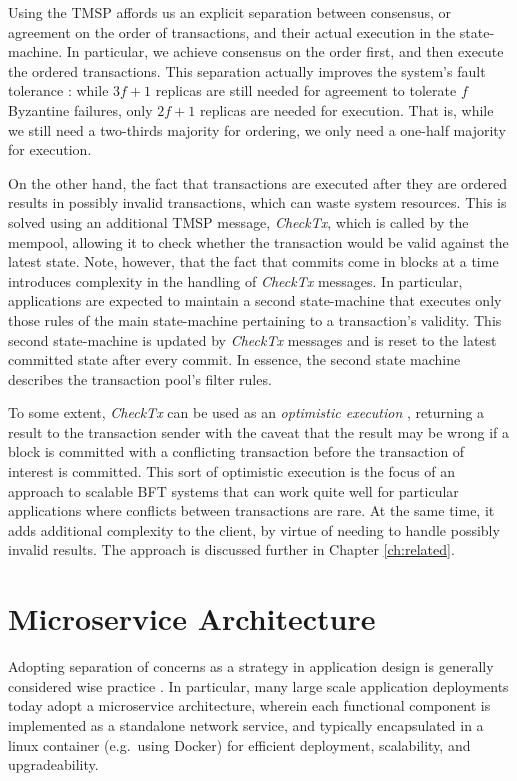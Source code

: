 Using the TMSP affords us an explicit separation between consensus, or agreement on the order of transactions, 
and their actual execution in the state-machine.
In particular, we achieve consensus on the order first, and then execute the ordered transactions.
This separation actually improves the system's fault tolerance \cite{yin2003separating}:
while $3f+1$ replicas are still needed for agreement to tolerate $f$ Byzantine failures, 
only $2f+1$ replicas are needed for execution.
That is, while we still need a two-thirds majority for ordering, we only need a one-half majority for execution.

On the other hand, the fact that transactions are executed after they are ordered results in possibly invalid transactions,
which can waste system resources. 
This is solved using an additional TMSP message, \emph{CheckTx}, which is called by the mempool,
allowing it to check whether the transaction would be valid against the latest state.
Note, however, that the fact that commits come in blocks at a time introduces complexity in the handling of \emph{CheckTx} messages.
In particular, applications are expected to maintain a second state-machine that executes only those rules of the main state-machine pertaining to a transaction's validity. 
This second state-machine is updated by \emph{CheckTx} messages and is reset to the latest committed state after every commit.
In essence, the second state machine describes the transaction pool's filter rules.

To some extent, \emph{CheckTx} can be used as an \emph{optimistic execution} \cite{optimistic_execution},
returning a result to the transaction sender with the caveat that 
the result may be wrong if a block is committed with a conflicting transaction
before the transaction of interest is committed.
This sort of optimistic execution is the focus of an approach to scalable BFT systems 
that can work quite well for particular applications where conflicts between transactions are rare. 
At the same time, it adds additional complexity to the client, by virtue of needing to handle possibly invalid results.
The approach is discussed further in Chapter \ref{ch:related}.

\section{Microservice Architecture}

Adopting separation of concerns as a strategy in application design is generally considered wise practice \cite{hursch1995separation}.
In particular, many large scale application deployments today adopt a microservice architecture,
wherein each functional component is implemented as a standalone network service, 
and typically encapsulated in a linux container (e.g.~using Docker) for efficient deployment, scalability, and upgradeability.

